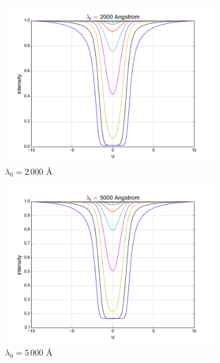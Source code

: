 \documentclass{article}
\begin{document}
\begin{figure}[H]
  \centering
  \begin{subfigure}[b]{0.49\textwidth}
    \includegraphics[width=\textwidth]{ssa_3_3_wave_1.png}
    \caption{$\lambda_0 = 2\,000$ Å}
  \end{subfigure}
  \begin{subfigure}[b]{0.49\textwidth}
    \includegraphics[width=\textwidth]{ssa_3_3_wave_2.png}
    \caption{$\lambda_0 = 5\,000$ Å}
  \end{subfigure}
  \begin{subfigure}[b]{0.49\textwidth}

\end{subfigure}
\end{figure}
\end{document}
